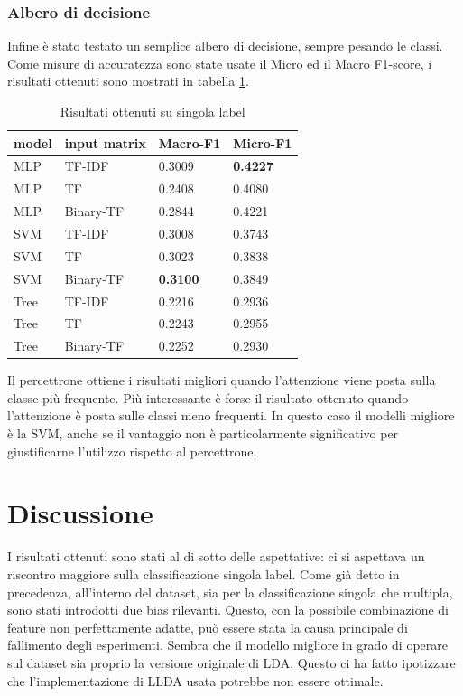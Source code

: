 \documentclass[technote]{IEEEtran}
\begin{document}
\subsubsection{Albero di decisione}
Infine \`e stato testato un semplice albero di decisione, sempre pesando le
classi.
\indent Come misure di accuratezza sono state usate il Micro ed il Macro
F1-score, i risultati ottenuti sono mostrati in tabella \ref{t_res_single}.
\begin{table}[H]
\centering
\caption{Risultati ottenuti su singola label}
\begin{tabular}{|l|l|l|l|}
\hline
\textbf{model} & \textbf{input matrix} & \textbf{Macro-F1} & \textbf{Micro-F1} \\ \hline
MLP            & TF-IDF                & 0.3009            & \textbf{0.4227}   \\ \hline
MLP            & TF                    & 0.2408            & 0.4080            \\ \hline
MLP            & Binary-TF             & 0.2844            & 0.4221            \\ \hline
SVM            & TF-IDF                & 0.3008            & 0.3743            \\ \hline
SVM            & TF                    & 0.3023            & 0.3838            \\ \hline
SVM            & Binary-TF             & \textbf{0.3100}   & 0.3849            \\ \hline
Tree           & TF-IDF                & 0.2216            & 0.2936            \\ \hline
Tree           & TF                    & 0.2243            & 0.2955            \\ \hline
Tree           & Binary-TF             & 0.2252            & 0.2930            \\ \hline
\end{tabular}
\label{t_res_single}
\end{table}
Il percettrone ottiene i risultati migliori quando l'attenzione viene posta
sulla classe più frequente.
Più interessante è forse il risultato ottenuto quando l'attenzione
è posta sulle classi meno frequenti. In questo caso il modelli migliore è la
SVM, anche se il vantaggio non è particolarmente significativo
per giustificarne l'utilizzo rispetto al percettrone.
\section{Discussione}
I risultati ottenuti sono stati al di sotto delle aspettative: ci si aspettava
un riscontro maggiore sulla classificazione singola label.
Come già detto in precedenza, all'interno del dataset, sia per
la classificazione singola che multipla, sono stati introdotti due bias
rilevanti.
Questo, con la possibile combinazione di feature non perfettamente adatte,
può essere stata la causa principale di fallimento degli esperimenti.
Sembra che il modello migliore in grado di operare
sul dataset sia proprio la versione originale di LDA.
Questo ci ha fatto ipotizzare che l'implementazione di LLDA usata 
potrebbe non essere ottimale.
\end{document}

